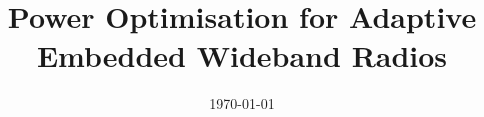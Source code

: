 \documentclass{ecsthesis}                %
\begin{document}
\frontmatter
\title      {Power Optimisation for Adaptive Embedded Wideband Radios}
\addresses  {\groupname\\\deptname\\\univname}
\date       {\today}
\subject    {}
\keywords   {}
\maketitle

	
    
    
\tableofcontents
\listoffigures
\listoftables
\renewcommand{\arraystretch}{1.5}

\end{document}
